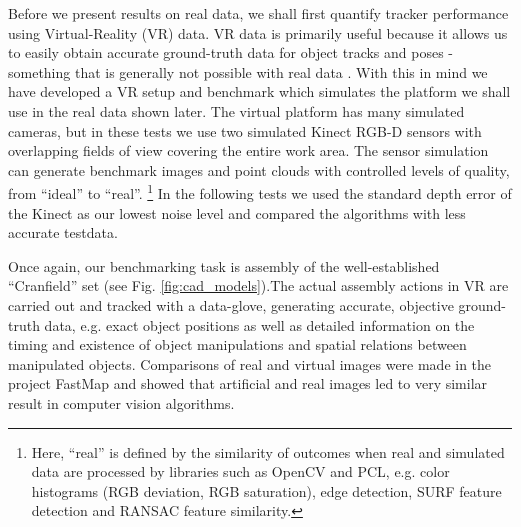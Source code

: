 Before we present results on real data, we shall first quantify tracker performance using Virtual-Reality (VR) data. VR data is primarily useful because it allows us to easily obtain accurate ground-truth data for object tracks and poses - something that is generally not possible with real data \cite{Rossmann2012d}. With this in mind we have developed a VR setup and benchmark \cite{VR_Benchmark_Paper} which simulates the platform we shall use in the real data shown later. The virtual platform has many simulated cameras, but in these tests we use two simulated Kinect RGB-D sensors with overlapping fields of view covering the entire work area. The sensor simulation can generate benchmark images and point clouds with controlled levels of quality, from ``ideal'' to ``real''. \footnote{Here, ``real'' is defined by the similarity of outcomes when real and simulated data are processed by libraries such as OpenCV and PCL, e.g. color histograms (RGB deviation, RGB saturation), edge detection, SURF feature detection and RANSAC feature similarity.} In the following tests we used the standard depth error of the Kinect as our lowest noise level and compared the algorithms with less accurate testdata.


Once again, our benchmarking task is assembly of the well-established ``Cranfield'' set \cite{Collins1985,Schou2012,Martinez2014} (see Fig. \ref{fig:cad_models}).The actual assembly actions in VR are carried out and tracked with a data-glove, generating accurate, objective ground-truth data, e.g. exact object positions as well as detailed information on the timing and existence of object manipulations and spatial relations between manipulated objects. Comparisons of real and virtual images were made in the project FastMap \cite{Rossmann2012b} and showed that artificial and real images led to very similar result in computer vision algorithms. 



